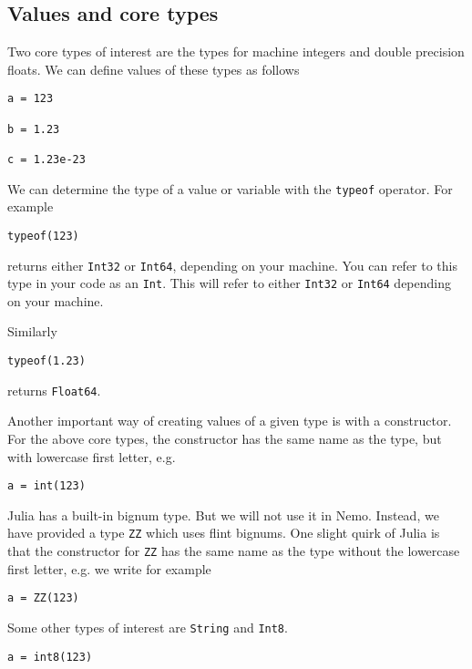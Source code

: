 \documentclass[a4paper,10pt]{article}
\newcommand{\code}{\lstinline}
\begin{document}
{{{\subsection{Values and core types}

Two core types of interest are the types for machine integers and double precision floats. We can
define values of these types as follows

\begin{lstlisting}
a = 123

b = 1.23

c = 1.23e-23
\end{lstlisting}

We can determine the type of a value or variable with the \code{typeof} operator. For example

\begin{lstlisting}
typeof(123)
\end{lstlisting}

returns either \code{Int32} or \code{Int64}, depending on your machine. You can refer to this type in
your code as an \code{Int}. This will refer to either \code{Int32} or \code{Int64} depending on your
machine.

Similarly

\begin{lstlisting}
typeof(1.23)
\end{lstlisting}

returns \code{Float64}.

Another important way of creating values of a given type is with a constructor. For the above core
types, the constructor has the same name as the type, but with lowercase first letter, e.g.

\begin{lstlisting}
a = int(123)
\end{lstlisting}

Julia has a built-in bignum type. But we will not use it in Nemo. Instead, we have provided a type
\code{ZZ} which uses flint bignums. One slight quirk of Julia is that the constructor for \code{ZZ}
has the same name as the type without the lowercase first letter, e.g. we write for example

\begin{lstlisting}
a = ZZ(123)
\end{lstlisting}

Some other types of interest are \code{String} and \code{Int8}.

\begin{lstlisting}
a = int8(123)


\end{lstlisting}}}}
\end{document}
